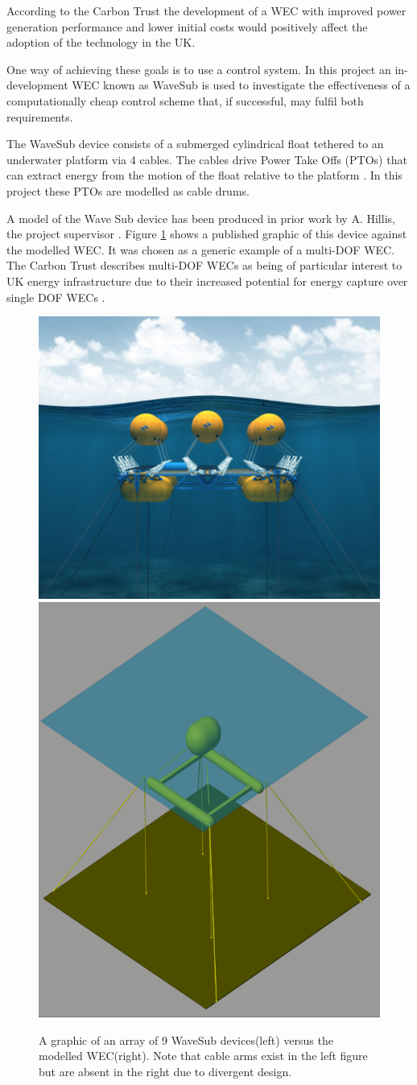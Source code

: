 \documentclass{report}
\begin{document}
\FloatBarrier

According to the Carbon Trust \cite{carbonTrust} the development of a WEC with improved power generation performance and lower initial costs would positively affect the adoption of the technology in the UK.

One way of achieving these goals is to use a control system. In this project an in-development WEC known as WaveSub\cite{waveSub} is used to investigate the effectiveness of a computationally cheap control scheme that, if successful, may fulfil both requirements.

The WaveSub device consists of a submerged cylindrical float tethered to an underwater platform via 4 cables\cite{waveSub}. The cables drive Power Take Offs (PTOs) that can extract energy from the motion of the float relative to the platform \cite{waveSub}. In this project these PTOs are modelled as cable drums.

A model of the Wave Sub device has been produced in prior work by A. Hillis, the project supervisor \cite{andyMPC}. Figure \ref{fig:waveSub} shows a published graphic\cite{waveSub} of this device against the modelled WEC\cite{andyMPC}. It was chosen as a generic example of a multi-DOF WEC. The Carbon Trust describes multi-DOF WECs as being of particular interest to UK energy infrastructure due to their increased potential for energy capture over single DOF WECs \cite{carbonTrust}.

\begin{figure}
\centering
\includegraphics[height=0.4\textwidth]{graphics/waveSub}
\includegraphics[height=0.4\textwidth]{graphics/wecSimFloat}
\caption{A graphic of an array of 9 WaveSub devices(left)\cite{waveSub} versus the modelled WEC(right). Note that cable arms exist in the left figure but are absent in the right due to divergent design.}
\label{fig:waveSub}
\end{figure}
\FloatBarrier
\end{document}
